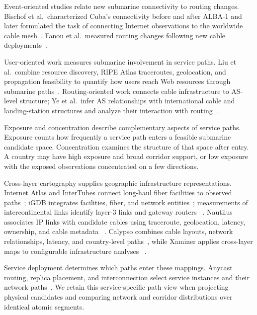 Event-oriented studies relate new submarine connectivity to routing changes.
Bischof et al.\ characterized Cuba's connectivity before and after ALBA-1 and
later formulated the task of connecting Internet observations to the worldwide
cable mesh~\cite{bischof2015cuba,bischof2018untangling}. Fanou et al.\ measured
routing changes following new cable deployments~\cite{fanou2020unintended}.

User-oriented work measures submarine involvement in service paths. Liu et
al.\ combine resource discovery, RIPE Atlas traceroutes, geolocation, and
propagation feasibility to quantify how users reach Web resources through
submarine paths~\cite{liu2020outofsight}. Routing-oriented work connects cable
infrastructure to AS-level structure; Ye et al.\ infer AS relationships with
international cable and landing-station structures and analyze their
interaction with routing~\cite{ye2023impact}.

Exposure and concentration describe complementary aspects of service paths.
Exposure counts how frequently a service path enters a feasible submarine
candidate space. Concentration examines the structure of that space after
entry. A country may have high exposure and broad corridor support, or low
exposure with the exposed observations concentrated on a few directions.

Cross-layer cartography supplies geographic infrastructure representations.
Internet Atlas and InterTubes connect long-haul fiber facilities to observed
paths~\cite{durairajan2013atlas,durairajan2015intertubes}; iGDB integrates
facilities, fiber, and network entities~\cite{anderson2022igdb}; measurements of
intercontinental links identify layer-3 links and gateway routers
~\cite{carisimo2023hopaway}. Nautilus associates IP links with candidate cables
using traceroute, geolocation, latency, ownership, and cable metadata
~\cite{ramanathan2023nautilus}. Calypso combines cable layouts, network
relationships, latency, and country-level paths~\cite{wang2025calypso}, while
Xaminer applies cross-layer maps to configurable infrastructure analyses
~\cite{ramanathan2024xaminer}.

Service deployment determines which paths enter these mappings. Anycast
routing, replica placement, and interconnection select service instances and
their network paths~\cite{cicalese2015anycast,devries2017anycast}. We retain
this service-specific path view when projecting physical candidates and
comparing network and corridor distributions over identical atomic segments.

